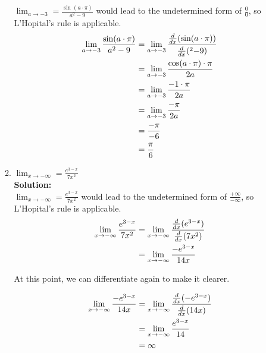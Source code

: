 \documentclass[a4paper]{article}
\begin{document}
\begin{enumerate}
\begin{enumerate}
$\lim_{a \to -3} = \frac{\sin(a \cdot \pi)}{a^2 - 9}$ would lead to the undetermined form of $\frac{0}{0}$, so L'Hopital's rule is applicable.\\
	
\begin{align*}
	\lim_{a \to -3} \frac{\sin(a \cdot \pi)}{a^2 - 9} &= \lim_{a \to -3} \frac{\frac{d}{dx}(\sin(a \cdot \pi))}{\frac{d}{dx}(^2 - 9)}\notag\\
	&= \lim_{a \to -3} \frac{\cos(a \cdot \pi) \cdot \pi}{2a}\notag\\
	&= \lim_{a \to -3} \frac{-1 \cdot \pi}{2a}\notag\\
	&= \lim_{a \to -3} \frac{-\pi}{2a}\notag\\	
	&= \frac{-\pi}{-6}\notag\\	
	&= \frac{\pi}{6}\notag	
\end{align*} 		
	
	
	
	
	\item $\lim_{x \to -\infty} = \frac{e^{3-x}}{7x^2}$\\
	\textbf{Solution:}\\
	
$\lim_{x \to -\infty} = \frac{e^{3-x}}{7x^2}$ would lead to the undetermined form of $\frac{+\infty}{-\infty}$, so L'Hopital's rule is applicable.\\	
	
	
	
	
\begin{align*}
	\lim_{x \to -\infty} \frac{e^{3-x}}{7x^2} &= \lim_{x \to -\infty} \frac{\frac{d}{dx}(e^{3-x})}{\frac{d}{dx}(7x^2)}\notag\\
	&= \lim_{x \to -\infty} \frac{-e^{3-x}}{14x}\notag\\
\end{align*} 	
	
At this point, we can differentiate again to make it clearer.

\begin{align*}
	\lim_{x \to -\infty} \frac{-e^{3-x}}{14x} &= \lim_{x \to -\infty} \frac{\frac{d}{dx}(-e^{3-x})}{\frac{d}{dx}(14x)}\notag\\
	&= \lim_{x \to -\infty} \frac{e^{3-x}}{14}\notag\\
	&= \infty\notag
\end{align*} 
	
	
	
\end{enumerate}

\newpage


\end{enumerate}
\end{document}
